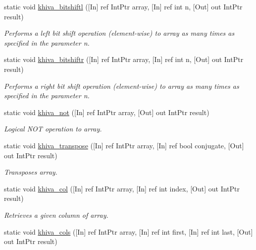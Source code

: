 \begin{DoxyCompactItemize}
static void \mbox{\hyperlink{classkhiva_1_1interop_1_1_d_l_l_array_ad4e05b6b3a7f5bdf4071af7e167cad1e}{khiva\+\_\+bitshiftl}} (\mbox{[}In\mbox{]} ref Int\+Ptr array, \mbox{[}In\mbox{]} ref int n, \mbox{[}Out\mbox{]} out Int\+Ptr result)
\begin{DoxyCompactList}\small\item\em Performs a left bit shift operation (element-\/wise) to array as many times as specified in the parameter n.\end{DoxyCompactList}\item 
static void \mbox{\hyperlink{classkhiva_1_1interop_1_1_d_l_l_array_a26bace5b212b2be6e0935db8ce87e110}{khiva\+\_\+bitshiftr}} (\mbox{[}In\mbox{]} ref Int\+Ptr array, \mbox{[}In\mbox{]} ref int n, \mbox{[}Out\mbox{]} out Int\+Ptr result)
\begin{DoxyCompactList}\small\item\em Performs a right bit shift operation (element-\/wise) to array as many times as specified in the parameter n.\end{DoxyCompactList}\item 
static void \mbox{\hyperlink{classkhiva_1_1interop_1_1_d_l_l_array_a2a70436d5aad2bcf2aef932fb643b1a5}{khiva\+\_\+not}} (\mbox{[}In\mbox{]} ref Int\+Ptr array, \mbox{[}Out\mbox{]} out Int\+Ptr result)
\begin{DoxyCompactList}\small\item\em Logical N\+OT operation to array.\end{DoxyCompactList}\item 
static void \mbox{\hyperlink{classkhiva_1_1interop_1_1_d_l_l_array_a3c36f406b88f909f8659daff96302f9a}{khiva\+\_\+transpose}} (\mbox{[}In\mbox{]} ref Int\+Ptr array, \mbox{[}In\mbox{]} ref bool conjugate, \mbox{[}Out\mbox{]} out Int\+Ptr result)
\begin{DoxyCompactList}\small\item\em Transposes array.\end{DoxyCompactList}\item 
static void \mbox{\hyperlink{classkhiva_1_1interop_1_1_d_l_l_array_aa7774ea0bc886ee100b2e5c8c4bc0b35}{khiva\+\_\+col}} (\mbox{[}In\mbox{]} ref Int\+Ptr array, \mbox{[}In\mbox{]} ref int index, \mbox{[}Out\mbox{]} out Int\+Ptr result)
\begin{DoxyCompactList}\small\item\em Retrieves a given column of array.\end{DoxyCompactList}\item 
static void \mbox{\hyperlink{classkhiva_1_1interop_1_1_d_l_l_array_a9ff314998131fb68ed5c635921e485e7}{khiva\+\_\+cols}} (\mbox{[}In\mbox{]} ref Int\+Ptr array, \mbox{[}In\mbox{]} ref int first, \mbox{[}In\mbox{]} ref int last, \mbox{[}Out\mbox{]} out Int\+Ptr result)

\end{DoxyCompactItemize}
